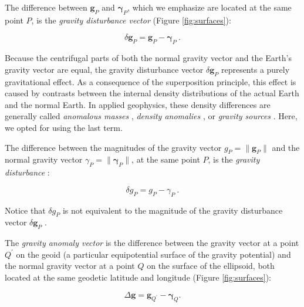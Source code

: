 \documentclass[manuscript]{geophysics}
\begin{document}
The difference between $\mathbf{g}_{P}$ and $\boldsymbol{\gamma}_{P}$,
which we emphasize are located at the same point $P$,
is the \textit{gravity disturbance vector} (Figure \ref{fig:surfaces}):

\begin{equation}
\delta \mathbf{g}_{P} =
\mathbf{g}_{P} - \boldsymbol{\gamma}_{P} \: .
\label{eq:gravity-disturbance-vector}
\end{equation}

Because the centrifugal parts of both the normal gravity vector
and the Earth's gravity vector are equal,
the gravity disturbance vector $\delta \mathbf{g}_{P}$
represents a purely gravitational effect.
As a consequence of the superposition principle,
this effect is caused by contrasts between
the internal density distributions
of the actual Earth and the normal Earth.
In applied geophysics, these density differences are generally called
\textit{anomalous masses} \citep[e.g.,][]{hammer1945,lafehr1965},
\textit{density anomalies} \citep[e.g.,][]{forsberg1984},
or \textit{gravity sources} \citep[e.g.,][]{blakely1996}.
Here, we opted for using the last term.

The difference between the magnitudes of the gravity vector
$g_{P} = \| \mathbf{g}_{P} \|$ and the normal gravity vector
$\gamma_{P} = \| \boldsymbol{\gamma}_{P} \|$,
at the same point $P$, is the \textit{gravity disturbance}
\citep{heiskanen-moritz1967, hofmann-wellenhof-moritz2005}:

\begin{equation}
\delta g_{P} = g_{P} - \gamma_{P} \: .
\label{eq:gravity-disturbance}
\end{equation}

\noindent
Notice that $\delta g_{P}$ is not equivalent
to the magnitude of the gravity disturbance vector
$\delta \mathbf{g}_{P}$ \citep{barthelmes2013, sanso_sideris2013}.

The \textit{gravity anomaly vector}
is the difference between the gravity
vector at a point $Q^{\prime}$ on the geoid
(a particular equipotential surface of the gravity potential)
and the normal gravity vector at a point $Q$ on the surface of the ellipsoid,
both located at the same geodetic latitude and longitude
(Figure \ref{fig:surfaces}):

\begin{equation}
\Delta \mathbf{g} = \mathbf{g}_{Q^{\prime}} - \boldsymbol{\gamma}_{Q} .
\label{eq:gravity-anomaly-vector}
\end{equation}
\end{document}
